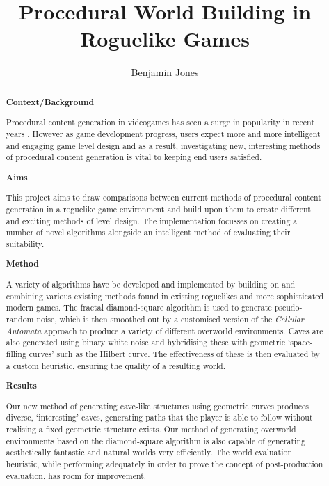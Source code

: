 \documentclass[12pt,a4paper]{article}
\title{Procedural World Building in Roguelike Games}
\author{Benjamin Jones}
\date{}
\begin{document}
\maketitle

\begin{abstract}

{\bf Context/Background}

Procedural content generation in videogames has seen a surge in popularity in recent years \cite{Hendrikx}. However as game development progress, users expect more and more intelligent and engaging game level design and as a result, investigating new, interesting methods of procedural content generation is vital to keeping end users satisfied.

{\bf Aims}

This project aims to draw comparisons between current methods of procedural content generation in a roguelike game environment and build upon them to create different and exciting methods of level design. The implementation focusses on creating a number of novel algorithms alongside an intelligent method of evaluating their suitability. 

{\bf Method}

A variety of algorithms have be developed and implemented by building on and combining various existing methods found in existing roguelikes and more sophisticated modern games. The fractal diamond-square algorithm is used to generate pseudo-random noise, which is then smoothed out by a customised version of the \emph{Cellular Automata} approach to produce a variety of different overworld environments. Caves are also generated using binary white noise and hybridising these with geometric `space-filling curves' such as the Hilbert curve. The effectiveness of these is then evaluated by a custom heuristic, ensuring the quality of a resulting world. 




{\bf Results}

Our new method of generating cave-like structures using geometric curves produces diverse, `interesting' caves, generating paths that the player is able to follow without realising a fixed geometric structure exists. Our method of generating overworld environments based on the diamond-square algorithm is also capable of generating aesthetically fantastic and natural worlds very efficiently. The world evaluation heuristic, while performing adequately in order to prove the concept of post-production evaluation, has room for improvement.


\end{abstract}
\end{document}
